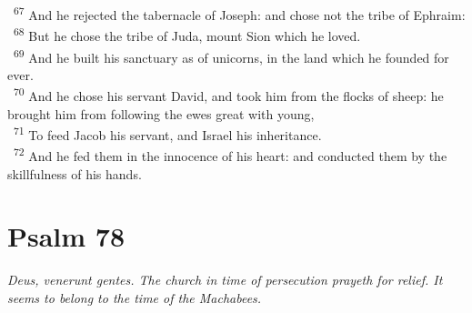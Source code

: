 \documentclass[a5paper,12pt]{article}
\begin{document}
\begin{multicols*}{2}
~\textsuperscript{67} And he rejected the tabernacle of Joseph: and chose not the tribe of Ephraim:\\
~\textsuperscript{68} But he chose the tribe of Juda, mount Sion which he loved.\\
~\textsuperscript{69} And he built his sanctuary as of unicorns, in the land which he founded for ever.\\
~\textsuperscript{70} And he chose his servant David, and took him from the flocks of sheep: he brought him from following the ewes great with young,\\
~\textsuperscript{71} To feed Jacob his servant, and Israel his inheritance.\\
~\textsuperscript{72} And he fed them in the innocence of his heart: and conducted them by the skillfulness of his hands.\\

\section{Psalm 78}
\label{sec:org7fd8452}
\emph{Deus, venerunt gentes. The church in time of persecution prayeth for relief. It seems to belong to the time of the Machabees.}\\


\end{multicols*}
\end{document}
